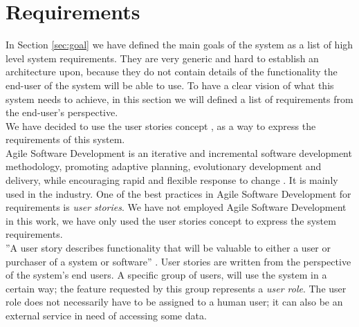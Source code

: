 \section{Requirements} %
\label{sec:requirements}
In Section \ref{sec:goal} we have defined the main goals of the system as a list of high level system requirements. They are very generic and hard to establish an architecture upon, because they do not contain details of the functionality the end-user of the system will be able to use. To have a clear vision of what this system needs to achieve, in this section we will defined a list of requirements from the end-user's perspective.\\

We have decided to use the user stories concept \cite{cohn2004user}, as a way to express the requirements of this system.\\

Agile Software Development is an iterative and incremental software development methodology, promoting adaptive planning, evolutionary development and delivery, while encouraging rapid and flexible response to change \cite{agile:online}. It is mainly used in the industry. One of the best practices in Agile Software Development for requirements is \emph{user stories}. We have not employed Agile Software Development in this work, we have only used the user stories concept to express the system requirements.\\

''A user story describes functionality that will be valuable to either a user or purchaser of a system or software'' \cite{cohn2004user}. User stories are written from the perspective of the system's end users. A specific group of users, will use the system in a certain way; the feature requested by this group represents a \emph{user role}. The user role does not necessarily have to be assigned to a human user; it can also be an external service in need of accessing some data.\\

